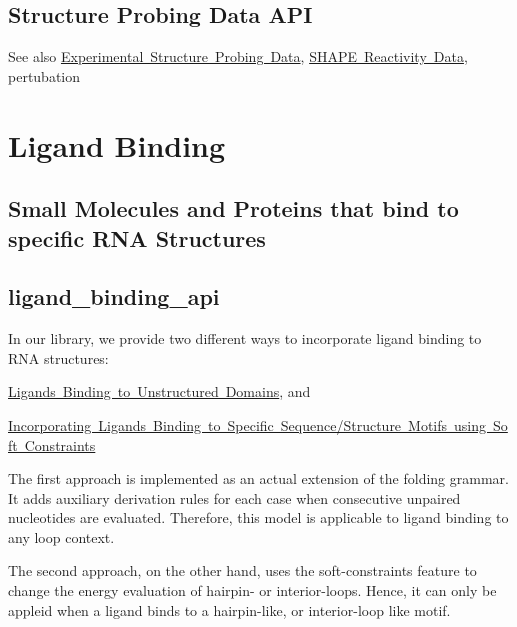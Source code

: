 \hypertarget{structure_probing_data_structure_probing_api}{}\subsection{Structure Probing Data A\+PI}\label{structure_probing_data_structure_probing_api}
\begin{DoxySeeAlso}{See also}
\mbox{\hyperlink{group__probing__data}{Experimental Structure Probing Data}}, \mbox{\hyperlink{group__SHAPE__reactivities}{S\+H\+A\+PE Reactivity Data}}, pertubation
\end{DoxySeeAlso}
 \hypertarget{ligand_binding}{}\section{Ligand Binding}\label{ligand_binding}
\hypertarget{ligand_binding_ligand_binding_intro}{}\subsection{Small Molecules and Proteins that bind to specific R\+N\+A Structures}\label{ligand_binding_ligand_binding_intro}
\hypertarget{ligand_binding_ligand_binding_api}{}\subsection{ligand\+\_\+binding\+\_\+api}\label{ligand_binding_ligand_binding_api}
In our library, we provide two different ways to incorporate ligand binding to R\+NA structures\+:


\begin{DoxyItemize}
\item \mbox{\hyperlink{group__ligands__up}{Ligands Binding to Unstructured Domains}}, and
\item \mbox{\hyperlink{group__constraints__ligand}{Incorporating Ligands Binding to Specific Sequence/\+Structure Motifs using Soft Constraints}}
\end{DoxyItemize}

The first approach is implemented as an actual extension of the folding grammar. It adds auxiliary derivation rules for each case when consecutive unpaired nucleotides are evaluated. Therefore, this model is applicable to ligand binding to any loop context.

The second approach, on the other hand, uses the soft-\/constraints feature to change the energy evaluation of hairpin-\/ or interior-\/loops. Hence, it can only be appleid when a ligand binds to a hairpin-\/like, or interior-\/loop like motif.

